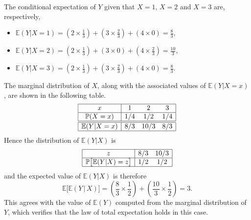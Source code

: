 \documentclass[lecture]{csm}
\newcommand{\prob}{\mathbb{P}}
\newcommand{\expe}{\mathbb{E}}
\def\it{\item}
\def\bit{\begin{itemize}}
\def\eit{\end{itemize}}
\begin{document}
\begin{solution}
The conditional expectation of $Y$ given that $X=1$, $X=2$ and $X=3$ are, respectively,
\bit
\it $\expe(Y|X=1) = \left(2\times\frac{1}{3}\right) + \left(3\times\frac{2}{3}\right) + \left(4\times 0\right) = \frac{8}{3}$,
\it $\expe(Y|X=2) = \left(2\times\frac{1}{3}\right) + \left(3\times 0\right) + \left(4\times\frac{2}{3}\right) = \frac{10}{3}$,
\it $\expe(Y|X=3) = \left(2\times\frac{1}{3}\right) + \left(3\times\frac{2}{3}\right) + \left(4\times 0\right) = \frac{8}{3}$.
\eit

The marginal distribution of $X$, along with the associated values of $\expe(Y|X=x)$, are shown in the following table.
\[\begin{array}{|c|ccc|}\hline
x				& 1		& 2		& 3		\\ \hline
\prob(X=x)		& 1/4	& 1/2	& 1/4	\\ \hline \hline
\expe(Y|X=x)		& 8/3	& 10/3	& 8/3	\\ \hline
\end{array}\]
Hence the distribution of $\expe(Y|X)$ is
\[\begin{array}{|c|cc|}\hline
z							& 8/3   & 10/3 \\ \hline
\prob\big[\expe(Y|X)=z\big]	& 1/2   & 1/2  \\ \hline
\end{array}\]
and the expected value of $\expe(Y|X)$ is therefore 
\[
\expe\big[\expe(Y\,|\,X)\big] = \left(\frac{8}{3}\times\frac{1}{2}\right) + \left(\frac{10}{3}\times\frac{1}{2}\right) = 3.
\]
This agrees with the value of $\expe(Y)$ computed from the marginal distribution of $Y$, which verifies that the law of total expectation holds in this case. 
\end{solution}





\end{document}
